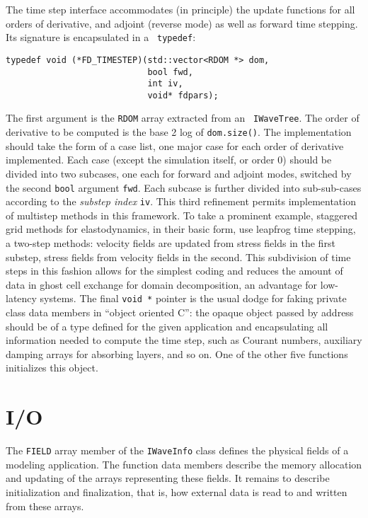 The time step interface accommodates (in principle) the update
functions for all orders of derivative, and adjoint (reverse mode) as
well as forward time stepping. Its signature is encapsulated in a {\tt
  typedef}:
\begin{verbatim}
typedef void (*FD_TIMESTEP)(std::vector<RDOM *> dom, 
                            bool fwd, 
                            int iv, 
                            void* fdpars);
\end{verbatim}
The first argument is the {\tt RDOM} array extracted from an {\tt
  IWaveTree}. The order of derivative to be computed is the base 2 log
of {\tt dom.size()}. The implementation should take the form of a case
list, one major case for each order of derivative implemented. Each
case (except the simulation itself, or order 0) should be divided into
two subcases, one each for forward and adjoint modes, switched by the
second {\tt bool} argument {\tt fwd}. Each subcase is further divided
into sub-sub-cases according to the {\em substep index} {\tt iv}. This
third refinement permits implementation of multistep methods in this
framework. To take a prominent example, staggered grid methods for
elastodynamics, in their basic form, use leapfrog time stepping, 
a two-step methods: velocity fields are updated from stress fields
in the first substep, stress fields from velocity fields in the
second. This subdivision of time steps in this fashion allows for the
simplest coding and reduces the amount of data in ghost cell exchange
for domain decomposition, an advantage for low-latency systems. The
final {\tt void *} pointer is the usual dodge for faking private class
data members in ``object oriented C'': the opaque object passed by
address should be of a type defined for the given application and
encapsulating all information needed to compute the time step, such as
Courant numbers, auxiliary damping arrays for absorbing layers, and so
on. One of the other five functions initializes this object.

\section{I/O}
The {\tt FIELD} array member of the {\tt IWaveInfo} class defines the
physical fields of a modeling application. The function data members
describe the memory allocation and updating of the arrays representing
these fields. It remains to describe initialization and finalization,
that is, how external data is read to and
written from these arrays.

